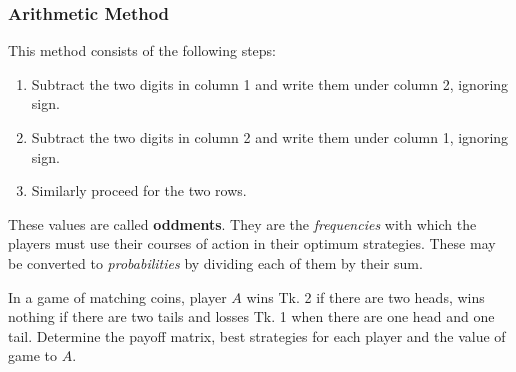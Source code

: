 \documentclass[../main-sheet.tex]{subfiles}
\begin{document}
    \subsubsection{Arithmetic Method}
    This method consists of the following steps:
    \begin{enumerate}[label=(\roman*)]
        \item Subtract the two digits in column 1 and write them under column 2, ignoring sign.
        \item Subtract the two digits in column 2 and write them under column 1, ignoring sign.
        \item Similarly proceed for the two rows.
    \end{enumerate}
    These values are called \textbf{oddments}. They are the \emph{frequencies} with which the players must use their courses of action in their optimum strategies. These may be converted to \emph{probabilities} by dividing each of them by their sum.
    \begin{ex}
        In a game of matching coins, player \(A\) wins Tk. 2 if there are two heads, wins nothing if there are two tails and losses Tk. 1 when there are one head and one tail. Determine the payoff matrix, best strategies for each player and the value of game to \(A\).
    \end{ex}
\end{document}

